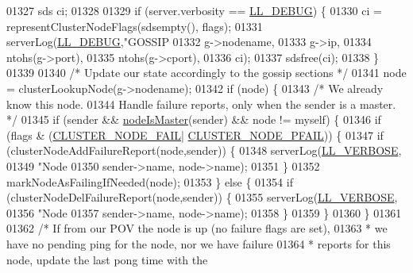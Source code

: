 \begin{DoxyCode}
{{{{{{{{{{{{{{{{{01327         sds ci;
01328 
01329         \textcolor{keywordflow}{if} (server.verbosity == \hyperlink{server_8h_abcaffe365dee628fcf9fc90c69d534a1}{LL\_DEBUG}) \{
01330             ci = representClusterNodeFlags(sdsempty(), flags);
01331             serverLog(\hyperlink{server_8h_abcaffe365dee628fcf9fc90c69d534a1}{LL\_DEBUG},\textcolor{stringliteral}{"GOSSIP %
01332                 g->nodename,
01333                 g->ip,
01334                 ntohs(g->port),
01335                 ntohs(g->cport),
01336                 ci);
01337             sdsfree(ci);
01338         \}
01339 
01340         \textcolor{comment}{/* Update our state accordingly to the gossip sections */}
01341         node = clusterLookupNode(g->nodename);
01342         \textcolor{keywordflow}{if} (node) \{
01343             \textcolor{comment}{/* We already know this node.}
01344 \textcolor{comment}{               Handle failure reports, only when the sender is a master. */}
01345             \textcolor{keywordflow}{if} (sender && \hyperlink{cluster_8h_a2d8e84269474d8750565fb3fb67aa436}{nodeIsMaster}(sender) && node != myself) \{
01346                 \textcolor{keywordflow}{if} (flags & (\hyperlink{cluster_8h_ad211e85c7baf8a5a59acd747e4e9005a}{CLUSTER\_NODE\_FAIL}|
      \hyperlink{cluster_8h_a5306c1ae8988b8be0a1a02bd9162dfa1}{CLUSTER\_NODE\_PFAIL})) \{
01347                     \textcolor{keywordflow}{if} (clusterNodeAddFailureReport(node,sender)) \{
01348                         serverLog(\hyperlink{server_8h_a479b60032f8da6d8ad72e1a9d0809950}{LL\_VERBOSE},
01349                             \textcolor{stringliteral}{"Node %
01350                             sender->name, node->name);
01351                     \}
01352                     markNodeAsFailingIfNeeded(node);
01353                 \} \textcolor{keywordflow}{else} \{
01354                     \textcolor{keywordflow}{if} (clusterNodeDelFailureReport(node,sender)) \{
01355                         serverLog(\hyperlink{server_8h_a479b60032f8da6d8ad72e1a9d0809950}{LL\_VERBOSE},
01356                             \textcolor{stringliteral}{"Node %
01357                             sender->name, node->name);
01358                     \}
01359                 \}
01360             \}
01361 
01362             \textcolor{comment}{/* If from our POV the node is up (no failure flags are set),}
01363 \textcolor{comment}{             * we have no pending ping for the node, nor we have failure}
01364 \textcolor{comment}{             * reports for this node, update the last pong time with the}
}}}}}}}}}}}}}}}}}}}}
\end{DoxyCode}
